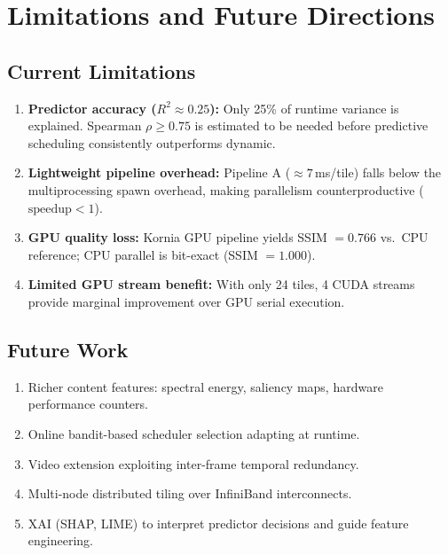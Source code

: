 \documentclass[12pt,a4paper]{article}
\begin{document}
\section{Limitations and Future Directions}

\subsection{Current Limitations}

\begin{enumerate}[leftmargin=*]
  \item \textbf{Predictor accuracy ($R^2\approx0.25$):} Only 25\% of runtime
        variance is explained. Spearman $\rho\geq0.75$ is estimated to be
        needed before predictive scheduling consistently outperforms dynamic.
  \item \textbf{Lightweight pipeline overhead:} Pipeline A ($\approx7$\,ms/tile)
        falls below the multiprocessing spawn overhead, making parallelism
        counterproductive ($\text{speedup}<1$).
  \item \textbf{GPU quality loss:} Kornia GPU pipeline yields SSIM $=0.766$
        vs.\ CPU reference; CPU parallel is bit-exact (SSIM $=1.000$).
  \item \textbf{Limited GPU stream benefit:} With only 24 tiles, 4 CUDA streams
        provide marginal improvement over GPU serial execution.
\end{enumerate}

\subsection{Future Work}

\begin{enumerate}[leftmargin=*]
  \item Richer content features: spectral energy, saliency maps, hardware
        performance counters.
  \item Online bandit-based scheduler selection adapting at runtime.
  \item Video extension exploiting inter-frame temporal redundancy.
  \item Multi-node distributed tiling over InfiniBand interconnects.
  \item XAI (SHAP, LIME) to interpret predictor decisions and guide feature
        engineering.
\end{enumerate}
\end{document}
